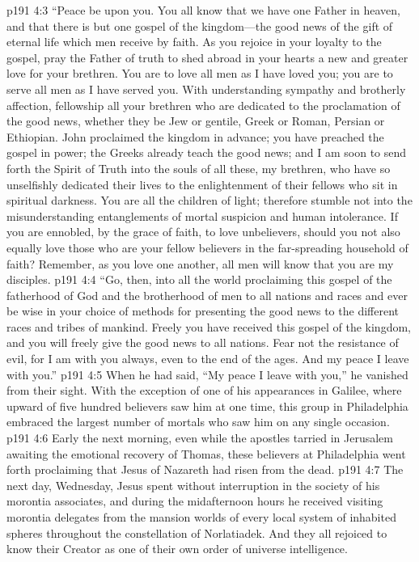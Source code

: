 \pc \vs p191 4:3 \textcolor{ubdarkred}{“Peace be upon you. You all know that we have one Father in heaven, and that there is but one gospel of the kingdom---the good news of the gift of eternal life which men receive by faith. As you rejoice in your loyalty to the gospel, pray the Father of truth to shed abroad in your hearts a new and greater love for your brethren. You are to love all men as I have loved you; you are to serve all men as I have served you. With understanding sympathy and brotherly affection, fellowship all your brethren who are dedicated to the proclamation of the good news, whether they be Jew or gentile, Greek or Roman, Persian or Ethiopian. John proclaimed the kingdom in advance; you have preached the gospel in power; the Greeks already teach the good news; and I am soon to send forth the Spirit of Truth into the souls of all these, my brethren, who have so unselfishly dedicated their lives to the enlightenment of their fellows who sit in spiritual darkness. You are all the children of light; therefore stumble not into the misunderstanding entanglements of mortal suspicion and human intolerance. If you are ennobled, by the grace of faith, to love unbelievers, should you not also equally love those who are your fellow believers in the far\hyp{}spreading household of faith? Remember, as you love one another, all men will know that you are my disciples.}\plusone
\vs p191 4:4 \textcolor{ubdarkred}{“Go, then, into all the world proclaiming this gospel of the fatherhood of God and the brotherhood of men to all nations and races and ever be wise in your choice of methods for presenting the good news to the different races and tribes of mankind. Freely you have received this gospel of the kingdom, and you will freely give the good news to all nations. Fear not the resistance of evil, for I am with you always, even to the end of the ages. And my peace I leave with you.”}
\pc \vs p191 4:5 When he had said, \textcolor{ubdarkred}{“My peace I leave with you,”} he vanished from their sight. With the exception of one of his appearances in Galilee, where upward of five hundred believers saw him at one time, this group in Philadelphia embraced the largest number of mortals who saw him on any single occasion.
\vs p191 4:6 Early the next morning, even while the apostles tarried in Jerusalem awaiting the emotional recovery of Thomas, these believers at Philadelphia went forth proclaiming that Jesus of Nazareth had risen from the dead.
\vs p191 4:7 The next day, Wednesday, Jesus spent without interruption in the society of his morontia associates, and during the midafternoon hours he received visiting morontia delegates from the mansion worlds of every local system of inhabited spheres throughout the constellation of Norlatiadek. And they all rejoiced to know their Creator as one of their own order of universe intelligence.

